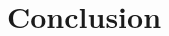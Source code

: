 \documentclass[11pt,parskip,abstracton,notitlepage, dvipsnames]{scrartcl}
\begin{document}
\section{Conclusion\label{sec:conclusion}}

\begin{spacing}{1.2}
	\renewcommand*{\bibfont}{\footnotesize}
	\printbibliography
\end{spacing}
\end{document}
